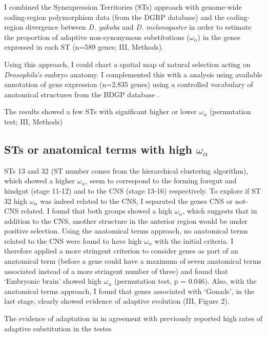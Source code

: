 
I combined the Synexpression Territories (STs) approach with genome-wide coding-region polymorphism data (from the DGRP database) and the coding-region divergence between \textit{D. yakuba} and \textit{D. melanogaster} in order to estimate the  proportion of adaptive non-synonymous substitutions ($\omega_{\alpha}$) in the genes expressed in each ST (n=589 genes; III, Methods).

Using this approach, I could chart a spatial map of natural selection acting on \textit{Drosophila}'s embryo anatomy.
I complemented this with a analysis using available annotation of gene expression (n=2,835 genes) using a controlled vocabulary of anatomical structures from the BDGP database \citep{Tomancak2007}.

The results showed a few STs with significant higher or lower $\omega_{\alpha}$ (permutation test; III, Methods)

\subsection{STs or anatomical terms with high $\omega_{\alpha}$}
STs 13 and 32 (ST number comes from the hierarchical clustering algorithm), which showed a higher $\omega_{\alpha}$, seem to correspond to the forming foregut and hindgut (stage 11-12) and to the CNS (stage 13-16) respectively.
To explore if ST 32 high $\omega_{\alpha}$ was indeed related to the CNS, I separated the genes CNS or not-CNS related.
I found that both groups showed a high $\omega_{\alpha}$, which suggests that in addition to the CNS, another structure in the anterior region would be under positive selection.
 Using the anatomical terms approach, no anatomical terms related to the CNS were found to have high $\omega_{\alpha}$ with the initial criteria.
I therefore applied a more stringent criterion to consider genes as part of an anatomical term (before a gene could have a maximum of seven anatomical terms associated instead of a more stringent number of three) and found that `Embryonic brain' showed high $\omega_{\alpha}$ (permutation test, p = 0.046).
Also, with the anatomical terms approach, I found that genes associated with `Gonads', in the last stage, clearly showed evidence of adaptive evolution (III, Figure 2).

The evidence of adaptation in in agreement with previously reported high rates of adaptive substitution in the testes \citep{Akashi1994,Civetta1995,Nuzhdin2004,Proschel2006}

